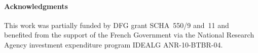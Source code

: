 \paragraph{Acknowledgments}

This work was partially funded by DFG grant SCHA~550/9 and~11 and benefited from the support of the French Government via the National Research Agency investment expenditure program IDEALG ANR-10-BTBR-04.

